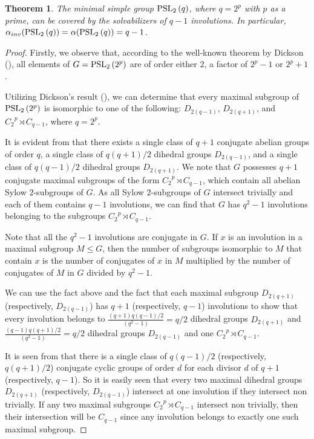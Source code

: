 \documentclass{amsart}
\newtheorem{theorem}{Theorem}[section]
\theoremstyle{definition}
\theoremstyle{remark}
\begin{document}
\begin{theorem}\label{PSL(2, 2^f)}
The minimal simple group $\operatorname{PSL}_{2}\left(q\right)$, where $q=2^p$ with $p$ as a prime, can be covered by the solvabilizers of $q-1$ involutions. In particular, $\alpha_{inv}(\operatorname{PSL}_{2}\left(q\right))=\alpha(\operatorname{PSL}_{2}\left(q\right))=q-1$.
\end{theorem}
\begin{proof}
Firstly, we observe that, according to the well-known theorem by Dickson (\cite{Huppert}), all elements of $G=\operatorname{PSL}_{2}\left(2^p\right)$ are of order either $2$, a factor of $2^p-1$ or $2^p+1$.

Utilizing Dickson's result (\cite{Dickson}), we can determine that every maximal subgroup of $\operatorname{PSL}_{2}\left(2^p\right)$ is isomorphic to one of the following: $D_{2(q-1)}$, $D_{2(q+1)}$, and ${C_2}^p\rtimes C_{q-1}$, where $q=2^p$.

It is evident from \cite[Theorem 2.1]{King} that there exists a single class of $q+1$ conjugate abelian groups of order $q$, a single class of $q(q+1)/2$ dihedral groups $D_{2(q-1)}$, and a single class of $q(q-1)/2$ dihedral groups $D_{2(q+1)}$.
We note that $G$ possesses $q+1$ conjugate maximal subgroups of the form ${C_2}^p\rtimes C_{q-1}$, which contain all abelian Sylow $2$-subgroups of $G$. As all Sylow $2$-subgroups of $G$ intersect trivially and each of them contains $q-1$ involutions, we can find that $G$ has $q^2-1$ involutions belonging to the subgroups ${C_2}^p\rtimes C_{q-1}$. 

Note that all the $q^2-1$ involutions  are conjugate in $G$. If $x$ is an involution in a maximal subgroup $M\le G$, then the number of subgroups isomorphic to $M$ that contain $x$ is the number of conjugates of $x$ in $M$ multiplied by the number of conjugates of $M$ in $G$ divided by $q^2-1$. 

We can use the fact above and the fact that each maximal subgroup $D_{2(q+1)}$  (respectively, $D_{2(q-1)}$) has $q+1$ (respectively, $q-1$) involutions to show that every involution belongs to $\frac{(q+1){q(q-1)/2}}{(q^2-1)}=q/2$ dihedral groups $D_{2(q+1)}$ and $\frac{(q-1) {q(q+1)/2}}{(q^2-1)}=q/2$ dihedral groups $D_{2(q-1)}$ and one ${C_2}^p\rtimes C_{q-1}$. 

It is seen from \cite[Theorem 2.1]{King} that there is a single class of $q(q-1)/2$ (respectively, $q(q+1)/2$) conjugate cyclic groups of order $d$ for each divisor $d$ of $q+1$ (respectively, $q-1$). So it is easily seen that every two maximal dihedral groups $D_{2(q+1)}$ (respectively, $D_{2(q-1)}$) intersect at one involution if they intersect non trivially. If any two maximal subgroups ${C_2}^p\rtimes C_{q-1}$ intersect non trivially, then their intersection will be $C_{q-1}$ since any involution belongs to exactly one such maximal subgroup. 


\end{proof}
\end{document}
